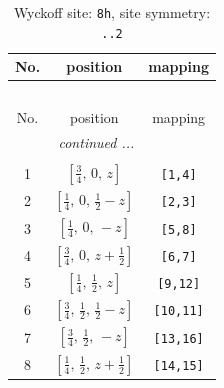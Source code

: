 \documentclass[fleqn,8pt]{jsarticle}
\begin{document}
\begin{longtable}{ccc}
\caption{Wyckoff site: {\tt 8h}, site symmetry: {\tt ..2}}
 \\
 \hline \hline
No. & position & mapping \\ \hline \endfirsthead

\multicolumn{2}{l}{\tablename\ \thetable{}} \\
 \hline \hline
No. & position & mapping \\ \hline \endhead

 \hline \hline
\multicolumn{2}{r}{\footnotesize\it continued ...} \\ \endfoot

 \hline \hline
\multicolumn{2}{r}{} \\ \endlastfoot

1 & $\left[ \frac{3}{4},\, 0,\, z \right]$ & {\tt [1,4]} \\ \hline
2 & $\left[ \frac{1}{4},\, 0,\, \frac{1}{2} - z \right]$ & {\tt [2,3]} \\ \hline
3 & $\left[ \frac{1}{4},\, 0,\, - z \right]$ & {\tt [5,8]} \\ \hline
4 & $\left[ \frac{3}{4},\, 0,\, z + \frac{1}{2} \right]$ & {\tt [6,7]} \\ \hline
5 & $\left[ \frac{1}{4},\, \frac{1}{2},\, z \right]$ & {\tt [9,12]} \\ \hline
6 & $\left[ \frac{3}{4},\, \frac{1}{2},\, \frac{1}{2} - z \right]$ & {\tt [10,11]} \\ \hline
7 & $\left[ \frac{3}{4},\, \frac{1}{2},\, - z \right]$ & {\tt [13,16]} \\ \hline
8 & $\left[ \frac{1}{4},\, \frac{1}{2},\, z + \frac{1}{2} \right]$ & {\tt [14,15]} \\
\end{longtable}
\renewcommand{\arraystretch}{1.2}
\end{document}
